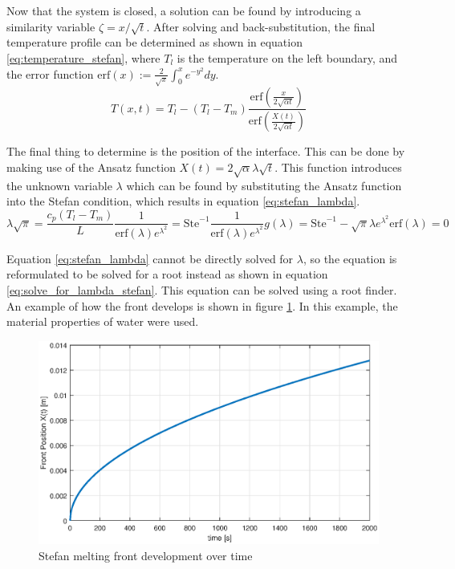 Now that the system is closed, a solution can be found by introducing a similarity variable $\zeta=x/\sqrt{t}$. After solving and back-substitution, the final temperature profile can be determined as shown in equation \ref{eq:temperature_stefan}, where $T_l$ is the temperature on the left boundary, and the error function $\text{erf}(x):=\frac{2}{\sqrt{x}}\int_0^x e^{-y^2}dy$.
\begin{equation}
	T(x,t) = T_l - (T_l-T_m)\frac{\text{erf}(\frac{x}{2\sqrt{\alpha t}})}{\text{erf}(\frac{X(t)}{2\sqrt{\alpha t}})}
	\label{eq:temperature_stefan}
\end{equation}

The final thing to determine is the position of the interface. This can be done by making use of the Ansatz function $X(t)=2\sqrt{\alpha}\lambda\sqrt{t}$. This function introduces the unknown variable $\lambda$ which can be found by substituting the Ansatz function into the Stefan condition, which results in equation \ref{eq:stefan_lambda}. 
\begin{subequations}
	\begin{equation}
		\lambda\sqrt{\pi}=\frac{c_p(T_l-T_m)}{L}\frac{1}{\text{erf}(\lambda)e^{\lambda^2}}=\text{Ste}^{-1} \frac{1}{\text{erf}(\lambda)e^{\lambda^2}}
		\label{eq:stefan_lambda}
	\end{equation}
	\begin{equation}
		g(\lambda)=\text{Ste}^{-1}-\sqrt{\pi}\lambda e^{\lambda^2}\text{erf}(\lambda) = 0
		\label{eq:solve_for_lambda_stefan}
	\end{equation}
\end{subequations}

Equation \ref{eq:stefan_lambda} cannot be directly solved for $\lambda$, so the equation is reformulated to be solved for a root instead as shown in equation \ref{eq:solve_for_lambda_stefan}. This equation can be solved using a root finder. An example of how the front develops is shown in figure \ref{fig:melt_front_movement}. In this example, the material properties of water were used.
\begin{figure}[ht]
	\centering
	\includegraphics[width=0.9\linewidth]{figures/chapter_2/StefanFront.eps}
	\caption{Stefan melting front development over time}
	\label{fig:melt_front_movement}
\end{figure}


